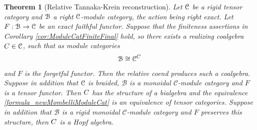 \documentclass[a4paper, reqno]{amsart}
\newtheorem{theorem}{Theorem}[section]
\theoremstyle{introTheorems}
\newcommand\cB{\mathcal{B}}
\newcommand\cC{\mathcal{C}}
\renewcommand{\1}{\mathbbold{1}}
\begin{document}
\begin{theorem}[Relative Tannaka-Krein reconstruction]\label{thm:infiniteML}
 Let $\mathcal{C}$ be a rigid tensor category  and $\mathcal{B}$ a right $\mathcal{C}$-module category, the action being right exact. Let $F:\mathcal{B}\to \mathcal{C}$ be an exact faithful functor. Suppose that the finiteness assertions in Corollary \ref{cor:ModuleCatFiniteFinal} hold, so there exists a realizing coalgebra $C\in \mathcal{C}$, such that as module categories 
 \begin{align}\label{formula_newMombelliModuleCat}
     \mathcal{B}\cong \mathcal{C}^C
 \end{align}
 and $F$ is the forgetful functor. Then the relative coend produces such a coalgebra. Suppose in addition that $\mathcal{C}$ is braided, $\cB$ is a monoidal $\cC$-module category and  $F$ is a tensor functor. Then $C$ has the structure of a bialgebra and the equivalence \eqref{formula_newMombelliModuleCat} is an equivalence of tensor categories. Suppose in addition that $\cB$ is a rigid monoidal $\cC$-module category and $F$ preserves this structure, then $C$ is a Hopf algebra. 
\end{theorem}
\end{document}
